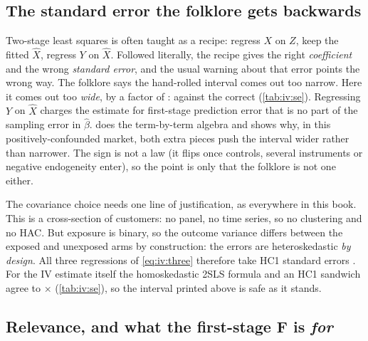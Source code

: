 \subsection*{The standard error the folklore gets backwards}

Two-stage least squares is often taught as a recipe: regress $X$ on $Z$, keep the fitted $\hat X$,
regress $Y$ on $\hat X$. Followed literally, the recipe gives the right \emph{coefficient} and the
wrong \emph{standard error}, and the usual warning about that error points the wrong way. The
folklore says the hand-rolled interval comes out too narrow. Here it comes out too \emph{wide}, by a
factor of \nbElevenSeHandRatio: \eur{\nbElevenSeHand} against the correct \eur{\nbElevenSeCorrect}
(\cref{tab:iv:se}). Regressing $Y$ on $\hat X$ charges the estimate for first-stage prediction error
that is no part of the sampling error in $\hat\beta$.  does the term-by-term
algebra and shows why, in this positively-confounded market, both extra pieces push the interval
wider rather than narrower. The sign is not a law (it flips once controls, several instruments or
negative endogeneity enter), so the point is only that the folklore is not one either.



The covariance choice needs one line of justification, as everywhere in this book. This is a
cross-section of \nbElevenN{} customers: no panel, no time series, so no clustering and no HAC. But
exposure is binary, so the outcome variance differs between the exposed and unexposed arms by
construction: the errors are heteroskedastic \emph{by design}. All three regressions of
\cref{eq:iv:three} therefore take HC1 standard errors \citep{white1980, mackinnon1985}. For the IV
estimate itself the homoskedastic 2SLS formula and an HC1 sandwich agree to
\nbElevenSeRobustRatio$\times$ (\cref{tab:iv:se}), so the interval printed above is safe as it
stands.

\subsection*{Relevance, and what the first-stage F is \emph{for}}


